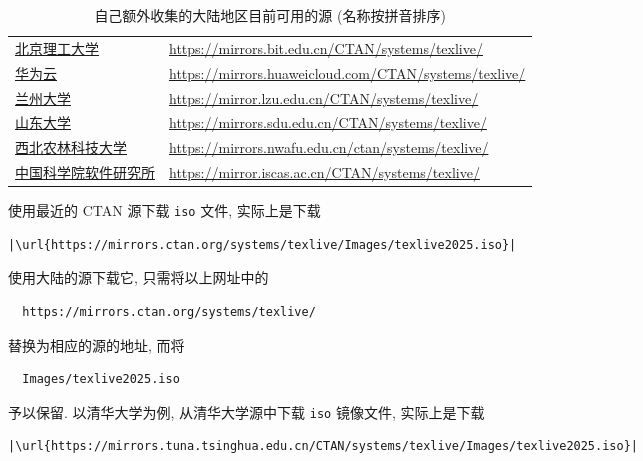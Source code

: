 \begin{table}
  \centering
  \caption{自己额外收集的大陆地区目前可用的源 (名称按拼音排序)}\label{tab:appendix:mirror-addition}
  \begin{tabular}{*{2}{l}}
    \hline\hline
    \href{https://mirrors.bit.edu.cn/web/}{北京理工大学}
    & \url{https://mirrors.bit.edu.cn/CTAN/systems/texlive/}\\
    \href{https://mirrors.huaweicloud.com/}{华为云}
    & \url{https://mirrors.huaweicloud.com/CTAN/systems/texlive/}\\
    \href{https://mirror.lzu.edu.cn/}{兰州大学}
    & \url{https://mirror.lzu.edu.cn/CTAN/systems/texlive/}\\
    \href{https://mirrors.sdu.edu.cn/}{山东大学}
    & \url{https://mirrors.sdu.edu.cn/CTAN/systems/texlive/}\\
    \href{https://mirrors.nwafu.edu.cn/}{西北农林科技大学}
    & \url{https://mirrors.nwafu.edu.cn/ctan/systems/texlive/}\\
    \href{https://mirror.iscas.ac.cn/}{中国科学院软件研究所}
    & \url{https://mirror.iscas.ac.cn/CTAN/systems/texlive/}\\
    \hline\hline
  \end{tabular}
\end{table}

使用最近的 CTAN 源下载 \texttt{iso} 文件,
实际上是下载
\begin{lstlisting}[escapechar=|]
  |\url{https://mirrors.ctan.org/systems/texlive/Images/texlive2025.iso}|
\end{lstlisting}
使用大陆的源下载它,
只需将以上网址中的
\begin{lstlisting}
  https://mirrors.ctan.org/systems/texlive/
\end{lstlisting}
替换为相应的源的地址,
而将
\begin{lstlisting}
  Images/texlive2025.iso
\end{lstlisting}
予以保留.
以清华大学为例,
从清华大学源中下载 \texttt{iso} 镜像文件,
实际上是下载
\begin{lstlisting}[escapechar = |]
  |\url{https://mirrors.tuna.tsinghua.edu.cn/CTAN/systems/texlive/Images/texlive2025.iso}|
\end{lstlisting}

